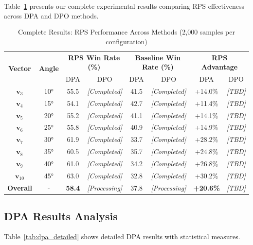 \documentclass{article} %
\begin{document}
Table~\ref{tab:comprehensive_results} presents our complete experimental results comparing RPS effectiveness across DPA and DPO methods.

\begin{table}[t]
\centering
\caption{Complete Results: RPS Performance Across Methods (2,000 samples per configuration)}
\label{tab:comprehensive_results}
\begin{tabular}{c|c|cc|cc|cc}
\toprule
\multirow{2}{*}{\textbf{Vector}} & \multirow{2}{*}{\textbf{Angle}} & \multicolumn{2}{c|}{\textbf{RPS Win Rate (\%)}} & \multicolumn{2}{c|}{\textbf{Baseline Win Rate (\%)}} & \multicolumn{2}{c}{\textbf{RPS Advantage}} \\
& & DPA & DPO & DPA & DPO & DPA & DPO \\
\midrule
$\mathbf{v}_3$ & 10° & 55.5 & \textit{[Completed]} & 41.5 & \textit{[Completed]} & +14.0\% & \textit{[TBD]} \\
$\mathbf{v}_4$ & 15° & 54.1 & \textit{[Completed]} & 42.7 & \textit{[Completed]} & +11.4\% & \textit{[TBD]} \\
$\mathbf{v}_5$ & 20° & 55.2 & \textit{[Completed]} & 41.1 & \textit{[Completed]} & +14.1\% & \textit{[TBD]} \\
$\mathbf{v}_6$ & 25° & 55.8 & \textit{[Completed]} & 40.9 & \textit{[Completed]} & +14.9\% & \textit{[TBD]} \\
$\mathbf{v}_7$ & 30° & 61.9 & \textit{[Completed]} & 33.7 & \textit{[Completed]} & +28.2\% & \textit{[TBD]} \\
$\mathbf{v}_8$ & 35° & 60.5 & \textit{[Completed]} & 35.7 & \textit{[Completed]} & +24.8\% & \textit{[TBD]} \\
$\mathbf{v}_9$ & 40° & 61.0 & \textit{[Completed]} & 34.2 & \textit{[Completed]} & +26.8\% & \textit{[TBD]} \\
$\mathbf{v}_{10}$ & 45° & 63.0 & \textit{[Completed]} & 32.8 & \textit{[Completed]} & +30.2\% & \textit{[TBD]} \\
\midrule
\textbf{Overall} & - & \textbf{58.4} & \textit{[Processing]} & 37.8 & \textit{[Processing]} & \textbf{+20.6\%} & \textit{[TBD]} \\
\bottomrule
\end{tabular}
\end{table}

\subsection{DPA Results Analysis}

Table~\ref{tab:dpa_detailed} shows detailed DPA results with statistical measures.
\end{document}
